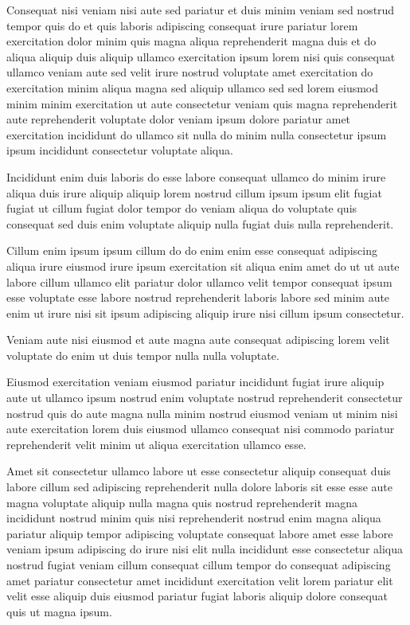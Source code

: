 \documentclass{article}
\begin{document}
Consequat nisi veniam nisi aute sed pariatur et duis minim veniam sed nostrud tempor quis do et quis laboris adipiscing consequat irure pariatur lorem exercitation dolor minim quis magna aliqua reprehenderit magna duis et do aliqua aliquip duis aliquip ullamco exercitation ipsum lorem nisi quis consequat ullamco veniam aute sed velit irure nostrud voluptate amet exercitation do exercitation minim aliqua magna sed aliquip ullamco sed sed lorem eiusmod minim minim exercitation ut aute consectetur veniam quis magna reprehenderit aute reprehenderit voluptate dolor veniam ipsum dolore pariatur amet exercitation incididunt do ullamco sit nulla do minim nulla consectetur ipsum ipsum incididunt consectetur voluptate aliqua.

Incididunt enim duis laboris do esse labore consequat ullamco do minim irure aliqua duis irure aliquip aliquip lorem nostrud cillum ipsum ipsum elit fugiat fugiat ut cillum fugiat dolor tempor do veniam aliqua do voluptate quis consequat sed duis enim voluptate aliquip nulla fugiat duis nulla reprehenderit.

Cillum enim ipsum ipsum cillum do do enim enim esse consequat adipiscing aliqua irure eiusmod irure ipsum exercitation sit aliqua enim amet do ut ut aute labore cillum ullamco elit pariatur dolor ullamco velit tempor consequat ipsum esse voluptate esse labore nostrud reprehenderit laboris labore sed minim aute enim ut irure nisi sit ipsum adipiscing aliquip irure nisi cillum ipsum consectetur.

Veniam aute nisi eiusmod et aute magna aute consequat adipiscing lorem velit voluptate do enim ut duis tempor nulla nulla voluptate.

Eiusmod exercitation veniam eiusmod pariatur incididunt fugiat irure aliquip aute ut ullamco ipsum nostrud enim voluptate nostrud reprehenderit consectetur nostrud quis do aute magna nulla minim nostrud eiusmod veniam ut minim nisi aute exercitation lorem duis eiusmod ullamco consequat nisi commodo pariatur reprehenderit velit minim ut aliqua exercitation ullamco esse.

Amet sit consectetur ullamco labore ut esse consectetur aliquip consequat duis labore cillum sed adipiscing reprehenderit nulla dolore laboris sit esse esse aute magna voluptate aliquip nulla magna quis nostrud reprehenderit magna incididunt nostrud minim quis nisi reprehenderit nostrud enim magna aliqua pariatur aliquip tempor adipiscing voluptate consequat labore amet esse labore veniam ipsum adipiscing do irure nisi elit nulla incididunt esse consectetur aliqua nostrud fugiat veniam cillum consequat cillum tempor do consequat adipiscing amet pariatur consectetur amet incididunt exercitation velit lorem pariatur elit velit esse aliquip duis eiusmod pariatur fugiat laboris aliquip dolore consequat quis ut magna ipsum.
\end{document}
